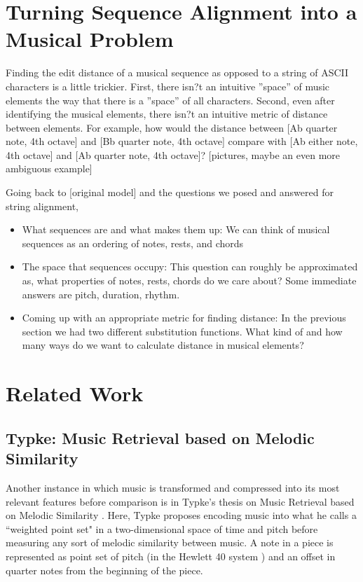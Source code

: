 \section{Turning Sequence Alignment into a Musical Problem}
Finding the edit distance of a musical sequence as opposed to a string of ASCII characters is a little trickier. First, there isn?t an intuitive ''space'' of music elements the way that there is a ''space'' of all characters. Second, even after identifying the musical elements, there isn?t an intuitive metric of distance between elements. For example, how would the distance between [Ab quarter note, 4th octave] and [Bb quarter note, 4th octave] compare with [Ab either note, 4th octave] and [Ab quarter note, 4th octave]? [pictures, maybe an even more ambiguous example]

Going back to [original model] and the questions we posed and answered for string alignment, 

\begin{itemize}
\item What sequences are and what makes them up: We can think of musical sequences as an ordering of notes, rests, and chords
\item The space that sequences occupy: This question can roughly be approximated as, what properties of notes, rests, chords do we care about? Some immediate answers are pitch, duration, rhythm.
\item Coming up with an appropriate metric for finding distance: In the previous section we had two different substitution functions. What kind of and how many ways do we want to calculate distance in musical elements?
\end {itemize}


\section{Related Work}
\subsection{Typke: Music Retrieval based on Melodic Similarity}
Another instance in which music is transformed and compressed into its most relevant features before comparison is in Typke's thesis on Music Retrieval based on Melodic Similarity \cite{typke}. Here, Typke proposes encoding music into what he calls a ``weighted point set" in a two-dimensional space of time and pitch before measuring any sort of melodic similarity between music. A note in a piece is represented as point set of pitch (in the Hewlett 40 system \cite{typke}) and an offset in quarter notes from the beginning of the piece.

